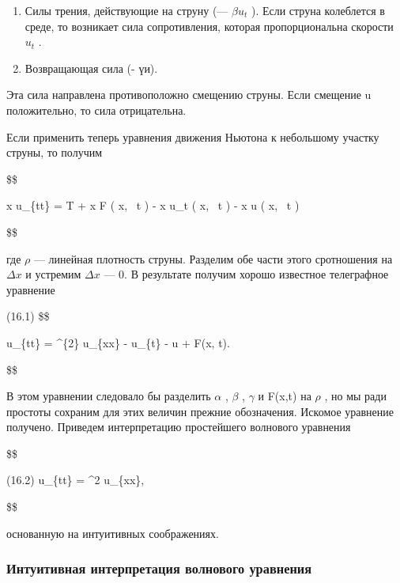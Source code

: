 \begin{enumerate}
\def\labelenumi{\arabic{enumi}.}
\setcounter{enumi}{2}
\item
  Силы трения, действующие на струну (--- \(\beta u_t\) ). Если струна колеблется в среде, то возникает сила сопротивления, которая пропорциональна скорости \(u_t\) .
\item
  Возвращающая сила (- үи).
\end{enumerate}

Эта сила направлена противоположно смещению струны. Если смещение u положительно, то сила отрицательна.

Если применить теперь уравнения движения Ньютона к небольшому участку струны, то получим

\$\$

\Delta x \rho u\_\{tt\} = T  + \Delta x F \left( x, ~t \right) - \Delta x \beta u\_t \left( x, ~t \right) - \Delta x \gamma u \left( x, ~t \right)

\$\$

где \(\rho\) --- линейная плотность струны. Разделим обе части этого сротношения на \(\Delta x\) и устремим \(\Delta x\) --- 0. В результате получим хорошо известное телеграфное уравнение

(16.1) \$\$

u\_\{tt\} = \alpha\^{}\{2\} u\_\{xx\} - \beta u\_\{t\} - \gamma u + F(x, t).

\$\$

В этом уравнении следовало бы разделить \(\alpha\) , \(\beta\) , \(\gamma\) и F(x,t) на \(\rho\) , но мы ради простоты сохраним для этих величин прежние обозначения. Искомое уравнение получено. Приведем интерпретацию простейшего волнового уравнения

\$\$

(16.2) u\_\{tt\} = \alpha\^{}2 u\_\{xx\},

\$\$

основанную на интуитивных соображениях.

\subsubsection{Интуитивная интерпретация волнового уравнения}\label{ux438ux43dux442ux443ux438ux442ux438ux432ux43dux430ux44f-ux438ux43dux442ux435ux440ux43fux440ux435ux442ux430ux446ux438ux44f-ux432ux43eux43bux43dux43eux432ux43eux433ux43e-ux443ux440ux430ux432ux43dux435ux43dux438ux44f}

